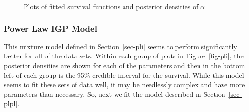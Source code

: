 \documentclass[
]{article}
\begin{document}
\begin{figure}[H]


\caption{\label{fig-pl}Plots of fitted survival functions and posterior
densities of \(\alpha\)}

\end{figure}%

\subsubsection{Power Law IGP Model}\label{power-law-igp-model}

This mixture model defined in Section~\ref{sec-pli} seems to perform
significantly better for all of the data sets. Within each group of
plots in Figure~\ref{fig-pli}, the posterior densities are shown for
each of the parameters and then in the bottom left of each group is the
95\% credible interval for the survival. While this model seems to fit
these sets of data well, it may be needlessly complex and have more
parameters than necessary. So, next we fit the model described in
Section~\ref{sec-plpl}.
\end{document}
